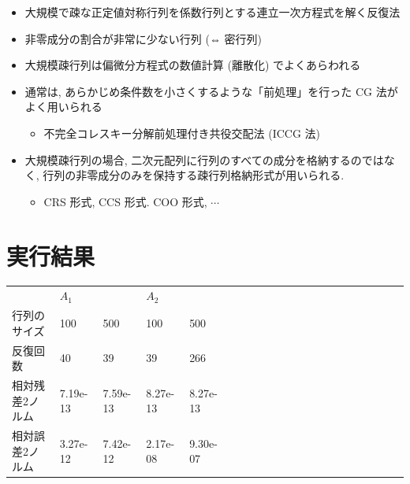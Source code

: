 \documentclass[titlepage, a4paper, 11pt, dvipdfmx]{jsarticle}
\begin{document}
    \begin{itemize}
        \item  大規模で疎な正定値対称行列を係数行列とする連立一次方程式を解く反復法
        \item  非零成分の割合が非常に少ない行列 (⇔ 密行列)
        \item 大規模疎行列は偏微分方程式の数値計算 (離散化) でよくあらわれる
        \item 通常は, あらかじめ条件数を小さくするような「前処理」を行った CG 法がよく用いられる
        \begin{itemize}
            \item 不完全コレスキー分解前処理付き共役交配法 (ICCG 法)
        \end{itemize}
        \item 大規模疎行列の場合, 二次元配列に行列のすべての成分を格納するのではなく, 行列の非零成分のみを保持する疎行列格納形式が用いられる.
        \begin{itemize}
            \item CRS 形式, CCS 形式. COO 形式, $\cdots$
        \end{itemize}
    \end{itemize}

\section{実行結果}

\begin{table}[H]
\begin{tabular}{|l|ll|ll|llllllllllllllll}
\cline{1-5}
\multicolumn{1}{|r|}{} & \multicolumn{2}{l|}{$A_1$}                                       & \multicolumn{2}{l|}{$A_2$}                                       &  &  &  &  &  &  &  &  &  &  &  &  &  &  &  &  \\ \cline{1-5}
行列のサイズ                 & \multicolumn{1}{l|}{100}                              & 500      & \multicolumn{1}{l|}{100}                              & 500      &  &  &  &  &  &  &  &  &  &  &  &  &  &  &  &  \\ \cline{1-5}
反復回数                   & 40       & 39       & 39       & 266      &  &  &  &  &  &  &  &  &  &  &  &  &  &  &  &  \\ \cline{1-5}
相対残差2ノルム               & 7.19e-13 & 7.59e-13 & 8.27e-13 & 8.27e-13 &  &  &  &  &  &  &  &  &  &  &  &  &  &  &  &  \\ \cline{1-5}
相対誤差2ノルム               & 3.27e-12                        & 7.42e-12 & 2.17e-08             & 9.30e-07 &  &  &  &  &  &  &  &  &  &  &  &  &  &  &  &  \\ \cline{1-5}
\end{tabular}
\end{table}
\end{document}
